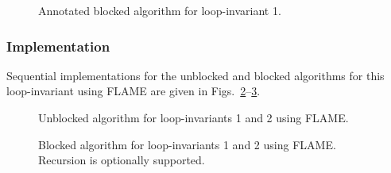 \renewcommand{\beforeupdate}{
\FlaTwoByOne{ 
\FlaTwoByOneSingleLine{ B_0 }{ B_1 }
}
{
B_2
} =
\FlaTwoByOne{ 
\FlaTwoByOneSingleLine{ \hat{B}_0 }{ \hat{B}_1 }
}
{
L_{22} \hat{B}_2
}
\wedge \ldots
}

\renewcommand{\afterupdate}{
\FlaTwoByOne{ 
B_0
}
{
\FlaTwoByOneSingleLine{ B_1 }{ B_2 }
} =
\FlaTwoByOne{ 
\hat{B}_0
}
{
\FlaTwoByOneSingleLine{ L_{11} \hat{B}_1 }{ L_{21} \hat{B}_1 + L_{22} \hat{B}_2 }
}
\wedge \ldots
}

\renewcommand{\update}{
\begin{minipage}[t]{4in}
\noindent
$ B_2 \becomes L_{21} B_1 + B_2 $\\
$ B_1 \becomes L_{11} B_1 $\\
\end{minipage}
}

\begin{figure}[htbp]
\worksheet
\caption{Annotated blocked algorithm for loop-invariant 1.}
\label{fig:ws:ltrmm_lln_blk}
\end{figure}
%

\subsubsection{Implementation}

Sequential implementations for the unblocked and blocked algorithms
for this loop-invariant using FLAME are given in
Figs.~\ref{fig:syrk_un_lazy_unb}--\ref{fig:syrk_un_lazy_blk}.

\begin{figure}[htbp]
\footnotesize
\begin{quote}
\end{quote}
\caption{Unblocked algorithm for loop-invariants 1 and 2 using FLAME.}
\label{fig:syrk_un_lazy_unb}
\end{figure}

\begin{figure}[htbp]
\footnotesize
{}%
\begin{quote}
\end{quote}
\caption{Blocked algorithm for loop-invariants 1 and 2 using FLAME.
Recursion is optionally supported.}
\label{fig:syrk_un_lazy_blk}
\end{figure}

